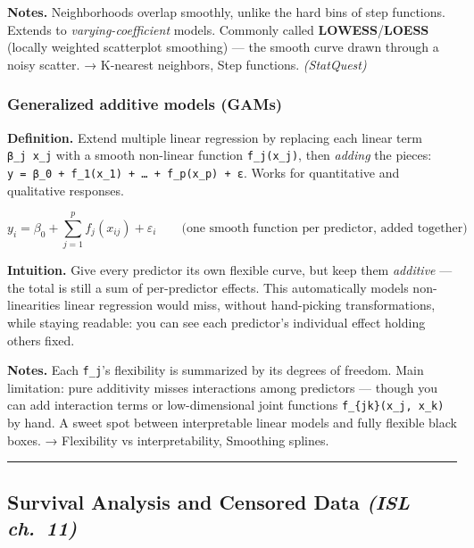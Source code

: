 \documentclass[
  10pt,
  letterpaper,
  onecolumn]{article}
\begin{document}
\textbf{Notes.} Neighborhoods overlap smoothly, unlike the hard bins of
step functions. Extends to \emph{varying-coefficient} models. Commonly
called \textbf{LOWESS}/\textbf{LOESS} (locally weighted scatterplot
smoothing) --- the smooth curve drawn through a noisy scatter. →
K-nearest neighbors, Step functions. \emph{(StatQuest)}

\hypertarget{generalized-additive-models-gams}{%
\subsubsection{Generalized additive models
(GAMs)}\label{generalized-additive-models-gams}}

\textbf{Definition.} Extend multiple linear regression by replacing each
linear term \texttt{β\_j\ x\_j} with a smooth non-linear function
\texttt{f\_j(x\_j)}, then \emph{adding} the pieces:
\texttt{y\ =\ β\_0\ +\ f\_1(x\_1)\ +\ …\ +\ f\_p(x\_p)\ +\ ε}. Works for
quantitative and qualitative responses.

\begin{equation*}
y_i=\beta_0+\sum_{j=1}^{p}f_j(x_{ij})+\varepsilon_i
\qquad\text{(one smooth function per predictor, added together)}
\end{equation*}

\textbf{Intuition.} Give every predictor its own flexible curve, but
keep them \emph{additive} --- the total is still a sum of per-predictor
effects. This automatically models non-linearities linear regression
would miss, without hand-picking transformations, while staying
readable: you can see each predictor's individual effect holding others
fixed.

\textbf{Notes.} Each \texttt{f\_j}'s flexibility is summarized by its
degrees of freedom. Main limitation: pure additivity misses interactions
among predictors --- though you can add interaction terms or
low-dimensional joint functions \texttt{f\_\{jk\}(x\_j,\ x\_k)} by hand.
A sweet spot between interpretable linear models and fully flexible
black boxes. → Flexibility vs interpretability, Smoothing splines.

\begin{center}\rule{0.5\linewidth}{0.5pt}\end{center}

\hypertarget{survival-analysis-and-censored-data-isl-ch.-11}{%
\subsection{\texorpdfstring{Survival Analysis and Censored Data
\emph{(ISL
ch.~11)}}{Survival Analysis and Censored Data (ISL ch.~11)}}\label{survival-analysis-and-censored-data-isl-ch.-11}}
\end{document}
